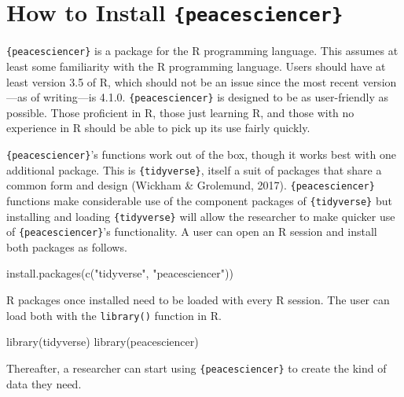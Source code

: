 \documentclass[
  11pt,
]{article}
\newenvironment{Shaded}{\begin{snugshade}}{\end{snugshade}}
\newcommand{\FunctionTok}[1]{\textcolor[rgb]{0.00,0.00,0.00}{#1}}
\newcommand{\NormalTok}[1]{#1}
\newcommand{\StringTok}[1]{\textcolor[rgb]{0.31,0.60,0.02}{#1}}
\begin{document}
\hypertarget{how-to-install-peacesciencer}{%
\section{\texorpdfstring{How to Install \texttt{\{peacesciencer\}}}{How to Install \{peacesciencer\}}}\label{how-to-install-peacesciencer}}

\texttt{\{peacesciencer\}} is a package for the R programming language. This assumes at least some familiarity with the R programming language. Users should have at least version 3.5 of R, which should not be an issue since the most recent version---as of writing---is 4.1.0. \texttt{\{peacesciencer\}} is designed to be as user-friendly as possible. Those proficient in R, those just learning R, and those with no experience in R should be able to pick up its use fairly quickly.

\texttt{\{peacesciencer\}}'s functions work out of the box, though it works best with one additional package. This is \texttt{\{tidyverse\}}, itself a suit of packages that share a common form and design (Wickham \& Grolemund, 2017). \texttt{\{peacesciencer\}} functions make considerable use of the component packages of \texttt{\{tidyverse\}} but installing and loading \texttt{\{tidyverse\}} will allow the researcher to make quicker use of \texttt{\{peacesciencer\}}'s functionality. A user can open an R session and install both packages as follows.

\begin{Shaded}
\begin{Highlighting}[]
\FunctionTok{install.packages}\NormalTok{(}\FunctionTok{c}\NormalTok{(}\StringTok{"tidyverse"}\NormalTok{, }\StringTok{"peacesciencer"}\NormalTok{))}
\end{Highlighting}
\end{Shaded}

R packages once installed need to be loaded with every R session. The user can load both with the \texttt{library()} function in R.

\begin{Shaded}
\begin{Highlighting}[]
\FunctionTok{library}\NormalTok{(tidyverse)}
\FunctionTok{library}\NormalTok{(peacesciencer)}
\end{Highlighting}
\end{Shaded}

Thereafter, a researcher can start using \texttt{\{peacesciencer\}} to create the kind of data they need.
\end{document}
